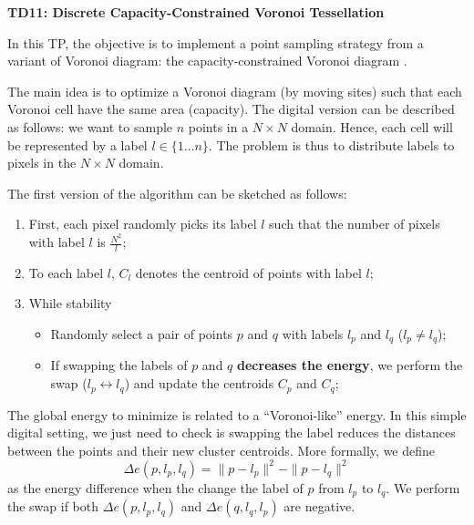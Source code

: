 \documentclass[a4paper, 11pt]{article}
\title{}
\author{}
\date{}
\begin{document}
\begin{center}
	\LARGE \textbf{TD11: Discrete Capacity-Constrained Voronoi Tessellation}
\end{center}

\bigskip
\par In this TP, the objective is to implement a point sampling
strategy from a variant of Voronoi diagram: the capacity-constrained
Voronoi diagram
\cite{BalzerHeck:2008:CCVDIFS,Balzer.etal:2009:CCPDAVoLM}.

The main idea is to optimize a Voronoi diagram (by moving sites) such
that each Voronoi cell have the same area (capacity).  The digital
version can be described as follows: we want to sample $n$ points in a
$N\times N$ domain. Hence, each cell will be represented by a label
$l\in\{1\ldots n\}$. The problem is thus to distribute labels to
pixels in the $N\times N$ domain.

The first version of the algorithm can be sketched as follows:

\begin{enumerate}
\item First, each pixel randomly picks its label $l$ such that the
  number of pixels with label $l$ is  $\frac{N^2}{l}$;
\item To each label $l$, $C_l$ denotes the centroid of points with
  label $l$;

\item While stability
  \begin{itemize}
  \item Randomly select a pair of points $p$ and $q$ with
    labels $l_p$ and $l_q$ ($l_p\neq l_q$);
  \item If swapping the labels of $p$ and $q$ \textbf{decreases the
    energy}, we perform the swap  ($l_p\leftrightarrow l_q$) and
    update the centroids $C_p$ and $C_q$;
  \end{itemize}
\end{enumerate}

The global energy to minimize is related to a ``Voronoi-like''
energy. In this simple digital setting, we just need to check is
swapping the label reduces the distances between the points and their
new cluster centroids.
More formally, we define
\begin{displaymath}
  \Delta e(p,l_p,l_q) = \|p-l_p\|^2 - \|p-l_q\|^2
\end{displaymath}
as the energy difference when the change the label of $p$ from $l_p$
to $l_q$. We perform the swap if both $\Delta e(p,l_p,l_q)$ and $\Delta
e(q,l_q,l_p)$ are negative.
\end{document}
